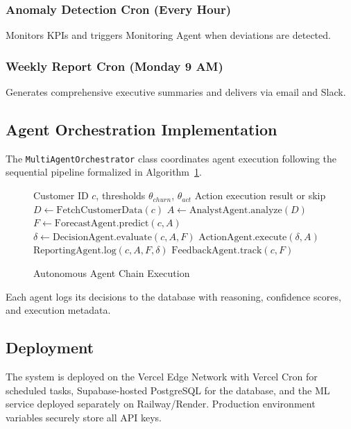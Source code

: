 \documentclass[conference]{IEEEtran}
\begin{document}
\subsubsection{Anomaly Detection Cron (Every Hour)}
Monitors KPIs and triggers Monitoring Agent when deviations are detected.

\subsubsection{Weekly Report Cron (Monday 9 AM)}
Generates comprehensive executive summaries and delivers via email and Slack.

\subsection{Agent Orchestration Implementation}
The \texttt{Multi\-Agent\-Orchestrator} class coordinates agent execution following the sequential pipeline formalized in Algorithm~\ref{alg:agent_chain}.

\begin{figure}[htbp]
\begin{algorithmic}
\renewcommand{\algorithmicrequire}{\textbf{Input:}}
\renewcommand{\algorithmicensure}{\textbf{Output:}}
\REQUIRE Customer ID $c$, thresholds $\theta_{churn}$, $\theta_{act}$
\ENSURE Action execution result or skip
\STATE $D \leftarrow \text{FetchCustomerData}(c)$
\STATE $A \leftarrow \text{AnalystAgent.analyze}(D)$ 
\STATE $F \leftarrow \text{ForecastAgent.predict}(c, A)$ 
  \STATE $\delta \leftarrow \text{DecisionAgent.evaluate}(c, A, F)$
    \STATE $\text{ActionAgent.execute}(\delta, A)$
    \STATE $\text{ReportingAgent.log}(c, A, F, \delta)$
  \ENDIF
\ENDIF
\STATE $\text{FeedbackAgent.track}(c, F)$ 
\end{algorithmic}
\caption{Autonomous Agent Chain Execution}
\label{alg:agent_chain}
\end{figure}

Each agent logs its decisions to the database with reasoning, confidence scores, and execution metadata.

\subsection{Deployment}
The system is deployed on the Vercel Edge Network with Vercel Cron for scheduled tasks, Supabase-hosted PostgreSQL for the database, and the ML service deployed separately on Railway/Render. Production environment variables securely store all API keys.
\end{document}
